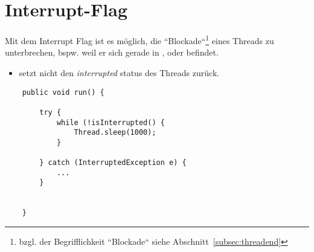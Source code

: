 \section{Interrupt-Flag}

Mit dem Interrupt Flag ist es möglich, die ``Blockade``\footnote{
bzgl. der Begrifflichkeit ``Blockade`` siehe Abschnitt~\ref{subsec:threadend}
} eines Threads zu unterbrechen, bspw. weil er sich gerade in ,  oder  befindet.

\begin{itemize}
    \item {} setzt nicht den \textit{interrupted} status des Threads zurück.
\end{itemize}

\begin{verbatim}
    public void run() {

        try {
            while (!isInterrupted() {
                Thread.sleep(1000);
            }

        } catch (InterruptedException e) {
            ...
        }


    }
\end{verbatim}